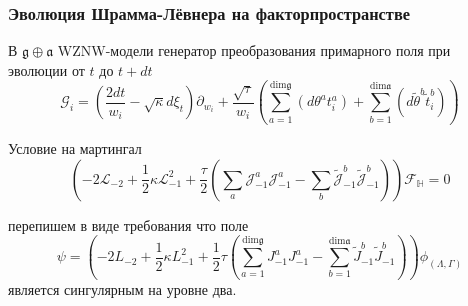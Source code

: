 \documentclass[pdftex]{beamer}
\newcommand{\gf}{\mathfrak{g}}
\newcommand{\af}{\mathfrak{a}}
\theoremstyle{definition} \newtheorem{Def}{Определение}
\begin{document}
\begin{frame}
  \frametitle{Эволюция Шрамма-Лёвнера на факторпространстве}
    В $\gf\oplus \af$ WZNW-модели генератор преобразования примарного поля при эволюции от $t$ до $t+dt$
  \begin{equation*}
    \mathcal{G}_{i}=\left(\frac{2dt}{w_{i}}-\sqrt{\kappa} d\xi_{t}\right) \partial_{w_{i}}+\frac{\sqrt{\tau}}{w_{i}}\left(\sum_{a=1}^{\mathrm{dim} \gf}\left(d \theta ^{a} t^{a}_{i}\right)+\sum_{b=1}^{\mathrm{dim} \af}\left(d \tilde{\theta} ^{b} \tilde{t}^{b}_{i}\right)\right)
  \end{equation*}

  Условие на мартингал
  \begin{equation*}
    \left(-2 \mathcal{L}_{-2}+\frac{1}{2}\kappa \mathcal{L}_{-1}^{2}+\frac{\tau}{2}\left( \sum_{a} \mathcal{J}^{a}_{-1} \mathcal{J}^{a}_{-1}-
        \sum_{b}\tilde{\mathcal{J}}^{b}_{-1} \tilde{\mathcal{J}}^{b}_{-1}\right)\right)        \mathcal{F}_{\mathbb{H}}=0
  \end{equation*}

перепишем в виде требования что поле
\begin{equation*}
  \psi=\left(-2L_{-2}+\frac{1}{2}\kappa L_{-1}^{2}+\frac{1}{2}\tau \left(\sum_{a=1}^{\mathrm{dim}\gf}J^{a}_{-1}J^{a}_{-1}-\sum_{b=1}^{\mathrm{dim}\af}\tilde{J}^{b}_{-1}\tilde{J}^{b}_{-1}\right)\right) \phi_{(\Lambda,\Gamma)}
\end{equation*}
является сингулярным на уровне два.
\end{frame}
\end{document}
